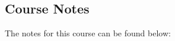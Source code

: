 \subsection{Course Notes}

The notes for this course can be found below: \coursedoc{\CSPBCompSysCourseNotes}




